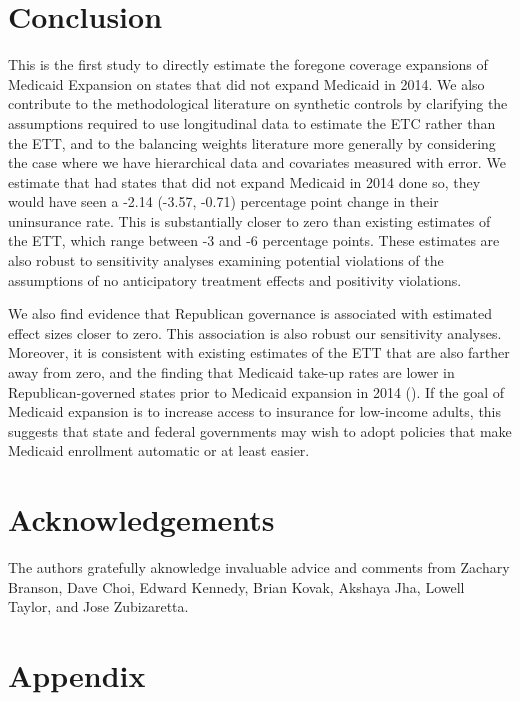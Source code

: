 \documentclass[12pt]{article}
\begin{document}
\section{Conclusion}

This is the first study to directly estimate the foregone coverage expansions of Medicaid Expansion on states that did not expand Medicaid in 2014. We also contribute to the methodological literature on synthetic controls by clarifying the assumptions required to use longitudinal data to estimate the ETC rather than the ETT, and to the balancing weights literature more generally by considering the case where we have hierarchical data and covariates measured with error. We estimate that had states that did not expand Medicaid in 2014 done so, they would have seen a -2.14 (-3.57, -0.71) percentage point change in their uninsurance rate. This is substantially closer to zero than existing estimates of the ETT, which range between -3 and -6 percentage points. These estimates are also robust to sensitivity analyses examining potential violations of the assumptions of no anticipatory treatment effects and positivity violations. 

We also find evidence that Republican governance is associated with estimated effect sizes closer to zero. This association is also robust our sensitivity analyses. Moreover, it is consistent with existing estimates of the ETT that are also farther away from zero, and the finding that Medicaid take-up rates are lower in Republican-governed states prior to Medicaid expansion in 2014 (\cite{sommers2012understanding}). If the goal of Medicaid expansion is to increase access to insurance for low-income adults, this suggests that state and federal governments may wish to adopt policies that make Medicaid enrollment automatic or at least easier.

\section{Acknowledgements}

The authors gratefully aknowledge invaluable advice and comments from Zachary Branson, Dave Choi, Edward Kennedy, Brian Kovak, Akshaya Jha, Lowell Taylor, and Jose Zubizaretta.

\cleardoublepage
 

\cleardoublepage

\section{Appendix}
\end{document}
